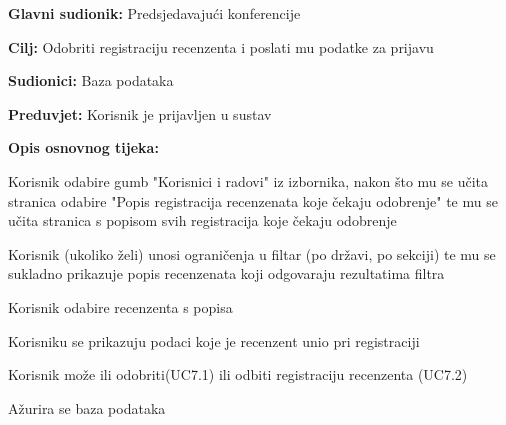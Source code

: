 					

				
					\noindent {}
					\begin{packed_item}
						
						\item \textbf{Glavni sudionik: } Predsjedavajući konferencije
						\item  \textbf{Cilj:} Odobriti registraciju recenzenta i poslati mu podatke za prijavu
						\item  \textbf{Sudionici:} Baza podataka
						\item  \textbf{Preduvjet:} Korisnik je prijavljen u sustav
						\item  \textbf{Opis osnovnog tijeka:}
						
						\item[] \begin{packed_enum}
							
							\item Korisnik odabire gumb "Korisnici i radovi" iz izbornika, nakon što mu se učita stranica odabire "Popis registracija recenzenata koje čekaju odobrenje" te mu se učita stranica s popisom svih registracija koje čekaju odobrenje
							\item Korisnik (ukoliko želi) unosi ograničenja u filtar (po državi, po sekciji) te mu se sukladno prikazuje popis recenzenata koji odgovaraju rezultatima filtra
							\item Korisnik odabire recenzenta s popisa
							\item Korisniku se prikazuju podaci koje je recenzent unio pri registraciji
							\item Korisnik može ili odobriti(UC7.1) ili odbiti registraciju recenzenta (UC7.2)
							\item Ažurira se baza podataka
							
							
						\end{packed_enum}
						
					\end{packed_item}
					
